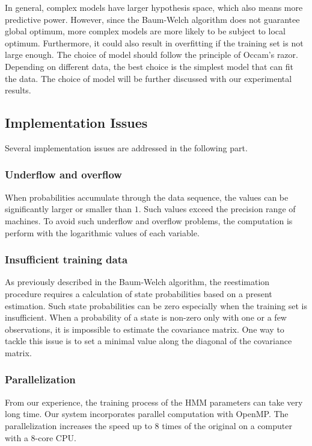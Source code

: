 \documentclass[12pt,final,twoside]{report}
\theoremstyle{plain}
\theoremstyle{definition}
\theoremstyle{remark}
\begin{document}
In general, complex models have larger hypothesis space, which also means more predictive power. However, since the Baum-Welch algorithm does not guarantee global optimum, more complex models are more likely to be subject to local optimum. Furthermore, it could also result in overfitting if the training set is not large enough. The choice of model should follow the principle of Occam's razor. Depending on different data, the best choice is the simplest model that can fit the data. The choice of model will be further discussed with our experimental results.

\subsection{Implementation Issues}
Several implementation issues are addressed in the following part.

\subsubsection{Underflow and overflow}

When probabilities accumulate through the data sequence, the values can be significantly larger or smaller than $1$. Such values exceed the precision range of machines. To avoid such underflow and overflow problems, the computation is perform with the logarithmic values of each variable. 

\subsubsection{Insufficient training data}

As previously described in the Baum-Welch algorithm, the reestimation procedure requires a calculation of state probabilities based on a present estimation. Such state probabilities can be zero especially when the training set is insufficient. When a probability of a state is non-zero only with one or a few observations, it is impossible to estimate the covariance matrix. One way to tackle this issue is to set a minimal value along the diagonal of the covariance matrix. 

\subsubsection{Parallelization}

From our experience, the training process of the HMM parameters can take very long time. Our system incorporates parallel computation with OpenMP. The parallelization increases the speed up to 8 times of the original on a computer with a 8-core CPU.
\end{document}

